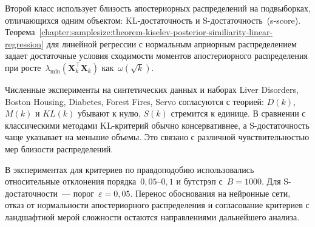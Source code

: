 Второй класс использует близость апостериорных распределений на подвыборках, отличающихся одним объектом: KL-достаточность и S-достаточность~(s-score). Теорема~\ref{chapter:samplesize:theorem-kiselev-posterior-similiarity-linear-regression} для линейной регрессии с нормальным априорным распределением задает достаточные условия сходимости моментов апостериорного распределения при росте~$\lambda_{\min}(\mathbf{X}_k^\top \mathbf{X}_k)$ как~$\omega(\sqrt{k})$.

Численные эксперименты на синтетических данных и наборах Liver Disorders, Boston Housing, Diabetes, Forest Fires, Servo согласуются с теорией: $D(k)$, $M(k)$ и $KL(k)$ убывают к нулю, $S(k)$ стремится к единице. В сравнении с классическими методами KL-критерий обычно консервативнее, а S-достаточность чаще указывает на меньшие объемы. Это связано с различной чувствительностью мер близости распределений.

В экспериментах для критериев по правдоподобию использовались относительные отклонения порядка~$0{,}05$--$0{,}1$ и бутстрэп с~$B=1000$. Для S-достаточности~--- порог~$\varepsilon=0{,}05$. Перенос обоснования на нейронные сети, отказ от нормальности апостериорного распределения и согласование критериев с ландшафтной мерой сложности остаются направлениями дальнейшего анализа.